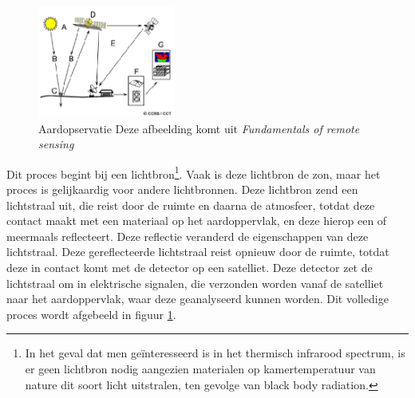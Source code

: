 \documentclass[12pt]{report}
\begin{document}
\begin{figure}
\includegraphics[width=0.4\textwidth]{rs.PNG}
\caption{Aardopservatie \label{fig:rs} Deze afbeelding komt uit \textit{Fundamentals of remote sensing\cite{fun}}}
\end{figure}




Dit proces begint bij een lichtbron\footnote{In het geval dat men ge\"interesseerd is in het thermisch infrarood spectrum, is er geen lichtbron nodig aangezien materialen op kamertemperatuur van nature dit soort licht uitstralen, ten gevolge van black body radiation.}. Vaak is deze lichtbron de zon, maar het proces is gelijkaardig voor andere lichtbronnen. Deze lichtbron zend een lichtstraal uit, die reist door de ruimte en daarna de atmosfeer, totdat deze contact maakt met een materiaal op het aardoppervlak, en deze hierop een of meermaals reflecteert. Deze reflectie veranderd de eigenschappen van deze lichtstraal. Deze gereflecteerde lichtstraal reist opnieuw door de ruimte, totdat deze in contact komt met de detector op een satelliet. Deze detector zet de lichtstraal om in elektrische signalen, die verzonden worden vanaf de satelliet naar het aardoppervlak, waar deze geanalyseerd kunnen worden. Dit volledige proces wordt afgebeeld in figuur \ref{fig:rs}. 



\end{document}
